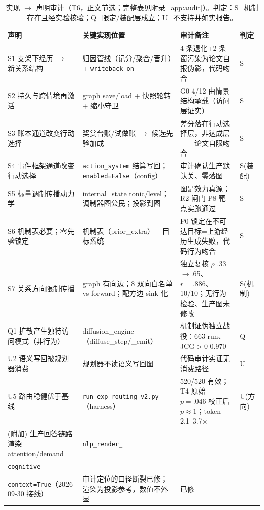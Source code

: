 \documentclass[10pt,a4paper]{ctexart}
\begin{document}
\begin{table}[t]
\centering\small
\caption{实现 $\rightarrow$ 声明审计（T6，正文节选；完整表见附录~\ref{app:audit}）。判定：S=机制存在且经实验核验；Q=限定/装配层成立；U=不支持并如实报告。}
\label{tab:audit}
\begin{tabular}{L{4.6cm}L{3.2cm}L{3.6cm}L{1.7cm}}
\toprule
\textbf{声明} & \textbf{关键实现位置} & \textbf{审计备注} & \textbf{判定} \\
\midrule
S1 支架下经历 $\rightarrow$ 新关系结构 & 归因管线（记分/聚合/晋升）+ \texttt{writeback\_on} & 4 条退化+2 条窗污染为论文自报伪影，代码吻合 & S \\
S2 持久与跨情境再激活 & graph save/load + 快照轮转 + 缩小守卫 & G0 4/12 由情景结构承载（访问层证实） & S \\
S3 账本通道改变行动选择 & 奖赏台账/试做账 $\rightarrow$ 候选先验加成 & 差分落在行动选择层，非达成层——论文自限吻合 & S \\
S4 事件框架通道改变行动选择 & \texttt{action\_system} 结算写回；\texttt{enabled=False}（config） & 审计确认生产默认关、零落图 & S(装配) \\
S5 标量调制传播动力学 & internal\_state tonic/level；调制器图公民；投影到图 & 图是效力真源；R2 闸门 P8 靶点实跑通过 & S \\
S6 机制表必要；零先验锁定 & 机制表（prior\_extra）+ 目标系统 & P0 锁定在不可达目标=上游经历生成失败，代码行为吻合 & S \\
S7 关系方向限制传播 & graph 有向边；8 双向白名单 vs forward；配方边 sink 化 & 独立复核 $\rho$ .33$\rightarrow$.65、$r{=}.886$、10/10；无行为检验、生产图未修改 & S(机制) \\
Q1 扩散产生独特访问模式（非行为） & diffusion\_engine（diffuse\_step/\_emit） & 机制证伪独立战役：663 run、JCG$>$0 0.970 & Q \\
U2 语义写回被规划器消费 & 规划器不读语义写回图 & 代码审计实证无消费路径 & U \\
U5 路由稳健优于基线 & \texttt{run\_exp\_routing\_v2.py}（harness） & 520/520 有效；T4 原始 $p{=}.046$ 校正后 $p{\approx}1$；token 2.1--3.7$\times$ & U(方向) \\
(附加) 生产回答链路渲染 attention/demand & \texttt{nlp\_render\_}\\ \texttt{cognitive\_}\\ \texttt{context=True}（2026-09-30 接线） & 审计定位的口径断裂已修；渲染为投影参考，数值不外显 & 已修 \\
\bottomrule
\end{tabular}
\end{table}
\end{document}
